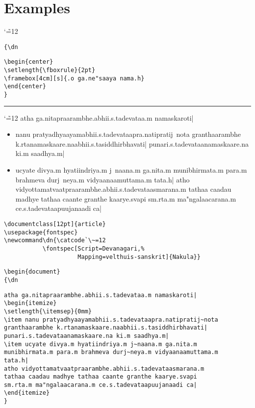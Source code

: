 \documentclass[12pt]{article}
\newcommand\dn{\catcode`\~=12
           \fontspec[Script=Devanagari,Mapping=velthuis-sanskrit]{Nakula}}
\begin{document}
\section{Examples}

{\dn
\begin{center}
\setlength{\fboxrule}{2pt}
\end{center}
}

\verb+{\+{\tt dn}
\begin{verbatim}
\begin{center}
\setlength{\fboxrule}{2pt}
\framebox[4cm][s]{.o ga.ne"saaya nama.h}
\end{center}
}
\end{verbatim}

\hrule
\medskip

{\dn
atha ga.nitapraarambhe.abhii.s.tadevataa.m namaskaroti|
\begin{itemize}
\setlength{\itemsep}{0mm}
\item nanu pratyadhyaayamabhii.s.tadevataapra.natipratij~nota
granthaarambhe k.rtanamaskaare.naabhii.s.tasiddhirbhavati|
punari.s.tadevataanamaskaare.na ki.m saadhya.m|
\item ucyate divya.m hyatiindriya.m j~naana.m ga.nita.m
munibhirmata.m para.m brahmeva durj~neya.m vidyaanaamuttama.m
tata.h| atho vidyottamatvaatpraarambhe.abhii.s.tadevataasmarana.m
tathaa caadau madhye tathaa caante granthe kaarye.svapi
sm.rta.m ma"ngalaacarana.m ce.s.tadevataapuujanaadi ca|
\end{itemize}
}

\begin{verbatim}
\documentclass[12pt]{article}
\usepackage{fontspec}
\newcommand\dn{\catcode`\~=12
           \fontspec[Script=Devanagari,%
                     Mapping=velthuis-sanskrit]{Nakula}}
\end{verbatim}
\verb+\+\verb+begin{document}+ \\
\verb+{\+{\tt dn}
\begin{verbatim}
atha ga.nitapraarambhe.abhii.s.tadevataa.m namaskaroti|
\begin{itemize}
\setlength{\itemsep}{0mm}
\item nanu pratyadhyaayamabhii.s.tadevataapra.natipratij~nota
granthaarambhe k.rtanamaskaare.naabhii.s.tasiddhirbhavati|
punari.s.tadevataanamaskaare.na ki.m saadhya.m|
\item ucyate divya.m hyatiindriya.m j~naana.m ga.nita.m
munibhirmata.m para.m brahmeva durj~neya.m vidyaanaamuttama.m
tata.h|
atho vidyottamatvaatpraarambhe.abhii.s.tadevataasmarana.m
tathaa caadau madhye tathaa caante granthe kaarye.svapi
sm.rta.m ma"ngalaacarana.m ce.s.tadevataapuujanaadi ca|
\end{itemize}
}
\end{verbatim}
\end{document}
